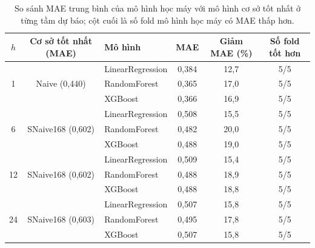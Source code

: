 \begin{table}[htbp]
\centering
\caption[So sánh mô hình học máy với mô hình cơ sở tốt nhất]{So sánh MAE trung bình của mô hình học máy với mô hình cơ sở tốt nhất ở từng tầm dự báo; cột cuối là số fold mô hình học máy có MAE thấp hơn.}
\label{tab:vs_baseline}
\small
\begin{tabular}{|c|c|l|c|c|c|}
\hline
\textbf{$h$} & \textbf{Cơ sở tốt nhất (MAE)} & \textbf{Mô hình} & \textbf{MAE} & \textbf{Giảm MAE (\%)} & \textbf{Số fold tốt hơn} \\
\hline
\multirow{3}{*}{1} & \multirow{3}{*}{Naive (0{,}440)} & LinearRegression & 0{,}384 & 12{,}7 & 5/5 \\
\cline{3-6}
 &  & RandomForest & 0{,}365 & 17{,}0 & 5/5 \\
\cline{3-6}
 &  & XGBoost & 0{,}366 & 16{,}9 & 5/5 \\
\hline
\multirow{3}{*}{6} & \multirow{3}{*}{SNaive168 (0{,}602)} & LinearRegression & 0{,}508 & 15{,}5 & 5/5 \\
\cline{3-6}
 &  & RandomForest & 0{,}482 & 20{,}0 & 5/5 \\
\cline{3-6}
 &  & XGBoost & 0{,}488 & 19{,}0 & 5/5 \\
\hline
\multirow{3}{*}{12} & \multirow{3}{*}{SNaive168 (0{,}602)} & LinearRegression & 0{,}509 & 15{,}4 & 5/5 \\
\cline{3-6}
 &  & RandomForest & 0{,}488 & 18{,}9 & 5/5 \\
\cline{3-6}
 &  & XGBoost & 0{,}488 & 18{,}8 & 5/5 \\
\hline
\multirow{3}{*}{24} & \multirow{3}{*}{SNaive168 (0{,}603)} & LinearRegression & 0{,}507 & 15{,}8 & 5/5 \\
\cline{3-6}
 &  & RandomForest & 0{,}495 & 17{,}8 & 5/5 \\
\cline{3-6}
 &  & XGBoost & 0{,}507 & 15{,}8 & 5/5 \\
\hline
\end{tabular}
\end{table}
